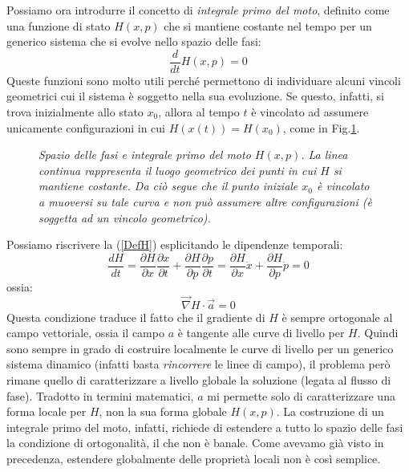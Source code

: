 \documentclass[a4paper,openany]{article}
\begin{document}
	
	Possiamo ora introdurre il concetto di \textit{integrale primo del moto}, definito come una funzione di stato $H(x,p)$ che si mantiene costante nel tempo per un generico sistema che si evolve nello spazio delle fasi:
	\begin{equation}
		\dfrac{d}{dt}H(x,p) = 0
		\label{DefH}
	\end{equation}
	Queste funzioni sono molto utili perché permettono di individuare alcuni vincoli geometrici cui il sistema è soggetto nella sua evoluzione. Se questo, infatti, si trova inizialmente allo stato $x_{0}$, allora al tempo $t$ è vincolato ad assumere unicamente configurazioni in cui $H(x(t))=H(x_{0})$, come in Fig.\ref{FigIntPrimi}.
	\begin{figure}
		\centering
		\caption{\textit{Spazio delle fasi e integrale primo del moto $H(x,p)$. La linea continua rappresenta il luogo geometrico dei punti in cui $H$ si mantiene costante. Da ciò segue che il punto iniziale $x_{0}$ è vincolato a muoversi su tale curva e non può assumere altre configurazioni (è soggetta ad un vincolo geometrico).}}
		\label{FigIntPrimi}
	\end{figure}
	Possiamo riscrivere la (\ref{DefH}) esplicitando le dipendenze temporali:
	$$
	\dfrac{dH}{dt} = \dfrac{\partial H}{\partial x}\dfrac{\partial x}{\partial t}  + \dfrac{\partial H}{\partial p}\dfrac{\partial p}{\partial t} = \dfrac{\partial H}{\partial x} \dot{x} + \dfrac{\partial H}{\partial p}\dot{p}    = 0
	$$
	ossia:
	\begin{equation}
		\vec{\nabla}H \cdot \vec{a} = 0
	\end{equation}
	Questa condizione traduce il fatto che il gradiente di $H$ è sempre ortogonale al campo vettoriale, ossia il campo $a$ è tangente alle curve di livello per $H$. Quindi sono sempre in grado di costruire localmente le curve di livello per un generico sistema dinamico (infatti basta \textit{rincorrere} le linee di campo), il problema però rimane quello di caratterizzare a livello globale la soluzione (legata al flusso di fase). Tradotto in termini matematici, $a$ mi permette solo di caratterizzare una forma locale per $H$, non la sua forma globale $H(x,p)$. La costruzione di un integrale primo del moto, infatti, richiede di estendere a tutto lo spazio delle fasi la condizione di ortogonalità, il che non è banale. Come avevamo già visto in precedenza, estendere globalmente delle proprietà locali non è così semplice.
	
\end{document}
